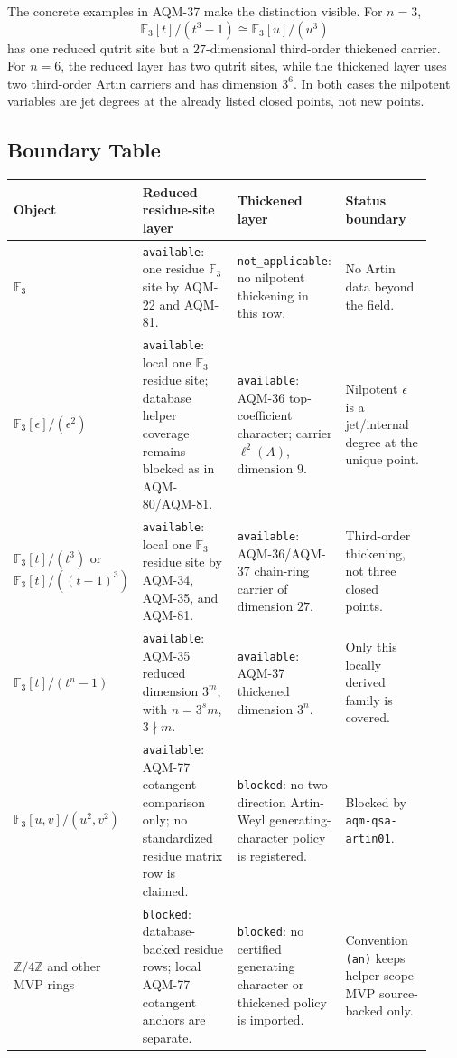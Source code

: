 The concrete examples in AQM-37 make the distinction visible.  For \(n=3\),
\[
  \mathbb F_3[t]/(t^3-1)\cong\mathbb F_3[u]/(u^3)
\]
has one reduced qutrit site but a \(27\)-dimensional third-order thickened
carrier.  For \(n=6\), the reduced layer has two qutrit sites, while the
thickened layer uses two third-order Artin carriers and has dimension \(3^6\).
In both cases the nilpotent variables are jet degrees at the already listed
closed points, not new points.

\subsection{Boundary Table}

\begin{center}
\scriptsize\setlength{\tabcolsep}{3pt}
\begin{tabular}{p{0.20\linewidth}p{0.24\linewidth}p{0.26\linewidth}p{0.22\linewidth}}
\toprule
Object & Reduced residue-site layer & Thickened layer & Status boundary \\
\midrule
\(\mathbb F_3\) &
\texttt{available}: one residue \(\mathbb F_3\) site by AQM-22 and
AQM-81. &
\texttt{not\_applicable}: no nilpotent thickening in this row. &
No Artin data beyond the field. \\
\addlinespace
\(\mathbb F_3[\epsilon]/(\epsilon^2)\) &
\texttt{available}: local one \(\mathbb F_3\) residue site; database helper
coverage remains blocked as in AQM-80/AQM-81. &
\texttt{available}: AQM-36 top-coefficient character; carrier
\(\ell^2(A)\), dimension \(9\). &
Nilpotent \(\epsilon\) is a jet/internal degree at the unique point. \\
\addlinespace
\(\mathbb F_3[t]/(t^3)\) or
\(\mathbb F_3[t]/((t-1)^3)\) &
\texttt{available}: local one \(\mathbb F_3\) residue site by AQM-34,
AQM-35, and AQM-81. &
\texttt{available}: AQM-36/AQM-37 chain-ring carrier of dimension \(27\). &
Third-order thickening, not three closed points. \\
\addlinespace
\(\mathbb F_3[t]/(t^n-1)\) &
\texttt{available}: AQM-35 reduced dimension \(3^m\), with
\(n=3^s m\), \(3\nmid m\). &
\texttt{available}: AQM-37 thickened dimension \(3^n\). &
Only this locally derived family is covered. \\
\addlinespace
\(\mathbb F_3[u,v]/(u^2,v^2)\) &
\texttt{available}: AQM-77 cotangent comparison only; no standardized
residue matrix row is claimed. &
\texttt{blocked}: no two-direction Artin-Weyl generating-character policy is
registered. &
Blocked by \texttt{aqm-qsa-artin01}. \\
\addlinespace
\(\mathbb Z/4\mathbb Z\) and other MVP rings &
\texttt{blocked}: database-backed residue rows; local AQM-77 cotangent
anchors are separate. &
\texttt{blocked}: no certified generating character or thickened policy is
imported. &
Convention \texttt{(an)} keeps helper scope MVP source-backed only. \\
\bottomrule
\end{tabular}
\end{center}

